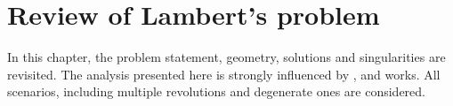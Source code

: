 \chapter{Review of Lambert's problem}
\label{sec:review_lambert}

In this chapter, the problem statement, geometry, solutions and singularities
are revisited. The analysis presented here is strongly influenced by
\cite{escobal1965}, \cite{el1968} and \cite{battin1999} works. All scenarios,
including multiple revolutions and degenerate ones are considered.






